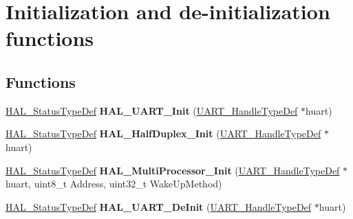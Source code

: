\hypertarget{group___u_a_r_t___exported___functions___group1}{}\section{Initialization and de-\/initialization functions}
\label{group___u_a_r_t___exported___functions___group1}
\subsection*{Functions}
\begin{DoxyCompactItemize}
\item 
\mbox{\label{group___u_a_r_t___exported___functions___group1_gabe47045024787099b0bfa82bbe7b0b6a}} 
\hyperlink{stm32f0xx__hal__def_8h_a63c0679d1cb8b8c684fbb0632743478f}{H\+A\+L\+\_\+\+Status\+Type\+Def} {\bfseries H\+A\+L\+\_\+\+U\+A\+R\+T\+\_\+\+Init} (\hyperlink{struct_u_a_r_t___handle_type_def}{U\+A\+R\+T\+\_\+\+Handle\+Type\+Def} $\ast$huart)
\item 
\mbox{\label{group___u_a_r_t___exported___functions___group1_ga927245827265eff1f3580a0121efd424}} 
\hyperlink{stm32f0xx__hal__def_8h_a63c0679d1cb8b8c684fbb0632743478f}{H\+A\+L\+\_\+\+Status\+Type\+Def} {\bfseries H\+A\+L\+\_\+\+Half\+Duplex\+\_\+\+Init} (\hyperlink{struct_u_a_r_t___handle_type_def}{U\+A\+R\+T\+\_\+\+Handle\+Type\+Def} $\ast$huart)
\item 
\mbox{\label{group___u_a_r_t___exported___functions___group1_gaae1b49f0cb62235141807d8cbc61bc4d}} 
\hyperlink{stm32f0xx__hal__def_8h_a63c0679d1cb8b8c684fbb0632743478f}{H\+A\+L\+\_\+\+Status\+Type\+Def} {\bfseries H\+A\+L\+\_\+\+Multi\+Processor\+\_\+\+Init} (\hyperlink{struct_u_a_r_t___handle_type_def}{U\+A\+R\+T\+\_\+\+Handle\+Type\+Def} $\ast$huart, uint8\+\_\+t Address, uint32\+\_\+t Wake\+Up\+Method)
\item 
\mbox{\label{group___u_a_r_t___exported___functions___group1_ga8d98eaab25e61ae12e2e240c3388c57b}} 
\hyperlink{stm32f0xx__hal__def_8h_a63c0679d1cb8b8c684fbb0632743478f}{H\+A\+L\+\_\+\+Status\+Type\+Def} {\bfseries H\+A\+L\+\_\+\+U\+A\+R\+T\+\_\+\+De\+Init} (\hyperlink{struct_u_a_r_t___handle_type_def}{U\+A\+R\+T\+\_\+\+Handle\+Type\+Def} $\ast$huart)

\end{DoxyCompactItemize}
